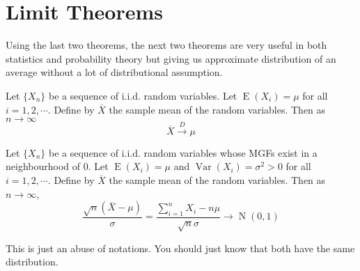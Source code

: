 \documentclass{huhtakm-template-book-v2}
\DeclareMathOperator{\E}{E}
\DeclareMathOperator{\Var}{Var}
\DeclareMathOperator{\N}{N}
\begin{document}
\section{Limit Theorems}
Using the last two theorems, the next two theorems are very useful in both statistics and probability theory but giving us approximate distribution of an average without a lot of distributional assumption.
\begin{thm}
	Let $\{X_{n}\}$ be a sequence of i.i.d. random variables. Let $\E(X_{i})=\mu$ for all $i=1,2,\cdots$. Define by $\overline{X}$ the sample mean of the random variables. Then as $n\to\infty$
	\begin{equation*}
		\overline{X}\xrightarrow{D}\mu
	\end{equation*}
\end{thm}
\begin{thm}
	Let $\{X_{n}\}$ be a sequence of i.i.d. random variables whose MGFs exist in a neighbourhood of $0$. Let $\E(X_{i})=\mu$ and $\Var(X_{i})=\sigma^{2}>0$ for all $i=1,2,\cdots$. Define by $\overline{X}$ the sample mean of the random variables. Then as $n\to\infty$,
	\begin{equation*}
		\frac{\sqrt{n}(\overline{X}-\mu)}{\sigma}=\frac{\sum_{i=1}^{n}X_{i}-n\mu}{\sqrt{n}\sigma}\to\N(0,1)
	\end{equation*}
\end{thm}
\begin{rem}
	This is just an abuse of notations. You should just know that both have the same distribution.
\end{rem}
\end{document}
